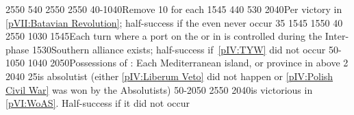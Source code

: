 %
%
{25}{50}{\EU@objNoActNavigation}%
%
%
{5}{40}{}%
%
%
%
{25}{50}{\EU@objEachCC}%
%
%
{25}{50}{\EU@objWoSS}%
%
%
{40-10}{40}{Remove 10 \VPs for each \EU@objEastMalacca}%
%
\EUobjective{}{\continentAmerica}{\COL}%
{15}{45}{\EU@objAmericaHOL}%
%
%
{4}{40}{\EU@objEastIndiesConvoy}%
%
%
%
{5}{30}{\EU@objMonopolyZone}%
%
%
{20}{40}{Per victory in \ref{pVII:Batavian Revolution}; half-success if the
  even never occur}%
%
%
{}{35}{\EU@objFranceContained}%
%
\EUobjective{}{\continentAmerica}{\COL}%
{15}{45}{\EU@objAmericaHOL}%
%
\EUobjective{}{\continentIndia}{\TP/\COL}%
{15}{50}{}%
%
 
%
%
{}{40}{\EU@objHalfHungary}%
%
%
{25}{50}{\EU@objGermanEmpire}%
%
%
{10}{30}{\EU@objBigAustria}%
%
%
{15}{45}{Each turn where a port on the \regionBaltique or in
  \payshanse is controlled during the Inter-phase}%
%
%
{15}{30}{Southern \HRE alliance exists; half-success if~\ref{pIV:TYW} did not
  occur}%
%
%
%
{50-10}{50}{}%
%
%
{10}{40}{\EU@objSpanishNetherlands}%
%
%
{20}{50}{Possessions of : Each Mediterranean island, or province
  in  above 2}%
%
%
{20}{40}{}%
%
%
{}{25}{\paysmajeurPologne is absolutist (either \ref{pIV:Liberum Veto} did not
happen or \ref{pIV:Polish Civil War} was won by the Absolutists)}%
%
%
%
{50-20}{50}{}%
%
%
{25}{50}{\EU@objWoSS}%
%
%
{20}{40}{\AUS is victorious in \ref{pVI:WoAS}. Half-success if it did not
  occur}%
%
%
